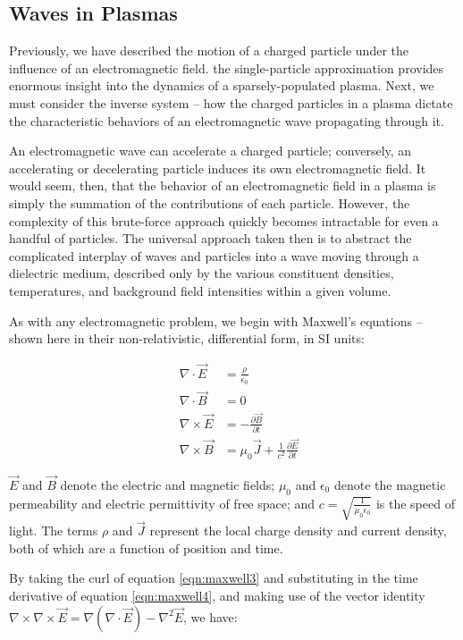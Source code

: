 \subsection{Waves in Plasmas}
Previously, we have described the motion of a charged particle under the influence of an electromagnetic field. the single-particle approximation provides enormous insight into the dynamics of a sparsely-populated plasma. Next, we must consider the inverse system -- how the charged particles in a plasma dictate the characteristic behaviors of an electromagnetic wave propagating through it.

An electromagnetic wave can accelerate a charged particle; conversely, an accelerating or decelerating particle induces its own electromagnetic field. It would seem, then, that the behavior of an electromagnetic field in a plasma is simply the summation of the contributions of each particle. However, the complexity of this brute-force approach quickly becomes intractable for even a handful of particles. The universal approach taken then is to abstract the complicated interplay of waves and particles into a wave moving through a dielectric medium, described only by the various constituent densities, temperatures, and background field intensities within a given volume. 

As with any electromagnetic problem, we begin with Maxwell's equations -- shown here in their non-relativistic, differential form, in SI units:

\begin{eqnarray}
&\nabla \cdot \vec{E}& = \frac{\rho}{\epsilon_0} \label{eqn:maxwell1}\\
&\nabla \cdot \vec{B}& = 0 \label{eqn:maxwell2}\\
&\nabla \times \vec{E}& = -\frac{\partial \vec{B}}{\partial t} \label{eqn:maxwell3}\\
&\nabla \times \vec{B}& = \mu_0 \vec{J} + \frac{1}{c^2}\frac{\partial \vec{E}}{\partial t} \label{eqn:maxwell4}
\end{eqnarray}

$\vec{E}$ and $\vec{B}$ denote the electric and magnetic fields; $\mu_0$ and $\epsilon_0$ denote the magnetic permeability and electric permittivity of free space; and $c=\sqrt{\frac{1}{\mu_0\epsilon_0}}$ is the speed of light. The terms $\rho$ and $\vec{J}$ represent the local charge density and current density, both of which are a function of position and time.

By taking the curl of equation \ref{eqn:maxwell3} and substituting in the time derivative of equation \ref{eqn:maxwell4}, and making use of the vector identity $\nabla \times \nabla \times \vec{E} = \nabla(\nabla \cdot \vec{E}) - \nabla^2\vec{E}$, we have:


